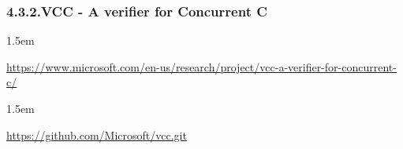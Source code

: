 \documentclass[12pt,twoside]{article}
\begin{document}
\subsubsection{4.3.2.\hspace*{0.5em}VCC - A verifier for Concurrent C}%

\begin{mddefinitions}%


\begin{mdbmarginx}{}{}{}{1.5em}%
\begin{mddefdata}%
\href{https://www.microsoft.com/en-us/research/project/vcc-a-verifier-for-concurrent-c/}{{\ttfamily https://\hspace{0pt}www.\hspace{0pt}microsoft.\hspace{0pt}com/\hspace{0pt}en-\hspace{0pt}us/\hspace{0pt}research/\hspace{0pt}project/\hspace{0pt}vcc-\hspace{0pt}a-\hspace{0pt}verifier-\hspace{0pt}for-\hspace{0pt}concurrent-\hspace{0pt}c/\hspace{0pt}}}
\end{mddefdata}%
\end{mdbmarginx}%


\begin{mdbmarginx}{}{}{}{1.5em}%
\begin{mddefdata}%
\href{https://github.com/Microsoft/vcc.git}{{\ttfamily https://\hspace{0pt}github.\hspace{0pt}com/\hspace{0pt}Microsoft/\hspace{0pt}vcc.\hspace{0pt}git}}%
\end{mddefdata}%
\end{mdbmarginx}%
\end{mddefinitions}%
\end{document}
